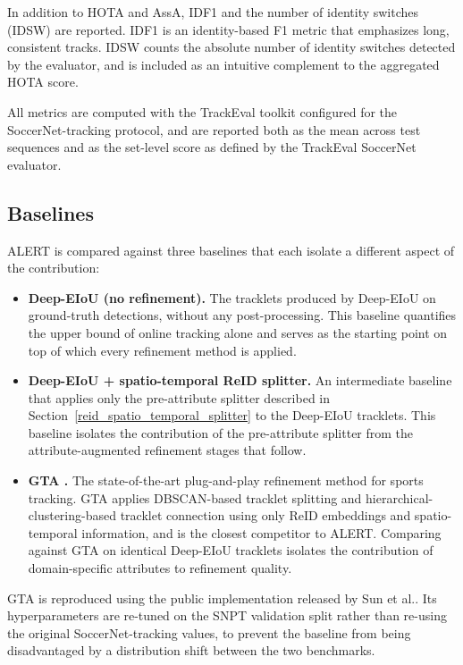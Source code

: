 In addition to HOTA and AssA, IDF1 \cite{idf1} and the number of identity switches (IDSW) are reported. IDF1 is an identity-based F1 metric that emphasizes long, consistent tracks. IDSW counts the absolute number of identity switches detected by the evaluator, and is included as an intuitive complement to the aggregated HOTA score.

All metrics are computed with the TrackEval toolkit \cite{trackeval} configured for the SoccerNet-tracking protocol, and are reported both as the mean across test sequences and as the set-level score as defined by the TrackEval SoccerNet evaluator.

\subsection{Baselines}\label{subsec:baselines}

ALERT is compared against three baselines that each isolate a different aspect of the contribution:

\begin{itemize}
    \item \textbf{Deep-EIoU (no refinement).} The tracklets produced by Deep-EIoU \cite{deep-eiou} on ground-truth detections, without any post-processing. This baseline quantifies the upper bound of online tracking alone and serves as the starting point on top of which every refinement method is applied.

    \item \textbf{Deep-EIoU + spatio-temporal ReID splitter.} An intermediate baseline that applies only the pre-attribute splitter described in Section~\ref{reid_spatio_temporal_splitter} to the Deep-EIoU tracklets. This baseline isolates the contribution of the pre-attribute splitter from the attribute-augmented refinement stages that follow.

    \item \textbf{GTA \cite{gta}.} The state-of-the-art plug-and-play refinement method for sports tracking. GTA applies DBSCAN-based tracklet splitting and hierarchical-clustering-based tracklet connection using only ReID embeddings and spatio-temporal information, and is the closest competitor to ALERT. Comparing against GTA on identical Deep-EIoU tracklets isolates the contribution of domain-specific attributes to refinement quality.
\end{itemize}

GTA is reproduced using the public implementation released by Sun et al.\cite{gta}. Its hyperparameters are re-tuned on the SNPT validation split rather than re-using the original SoccerNet-tracking values, to prevent the baseline from being disadvantaged by a distribution shift between the two benchmarks.

